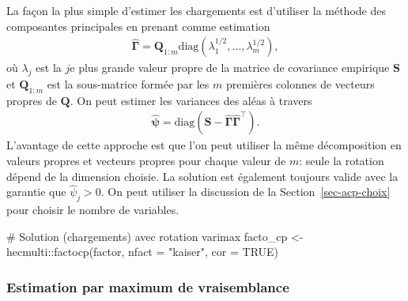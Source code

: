 \documentclass[
  11pt,
  letterpaper,
]{scrbook}
\newenvironment{Shaded}{\begin{snugshade}}{\end{snugshade}}
\newcommand{\AttributeTok}[1]{\textcolor[rgb]{0.40,0.45,0.13}{#1}}
\newcommand{\CommentTok}[1]{\textcolor[rgb]{0.37,0.37,0.37}{#1}}
\newcommand{\ConstantTok}[1]{\textcolor[rgb]{0.56,0.35,0.01}{#1}}
\newcommand{\FunctionTok}[1]{\textcolor[rgb]{0.28,0.35,0.67}{#1}}
\newcommand{\NormalTok}[1]{\textcolor[rgb]{0.00,0.23,0.31}{#1}}
\newcommand{\OtherTok}[1]{\textcolor[rgb]{0.00,0.23,0.31}{#1}}
\newcommand{\SpecialCharTok}[1]{\textcolor[rgb]{0.37,0.37,0.37}{#1}}
\newcommand{\StringTok}[1]{\textcolor[rgb]{0.13,0.47,0.30}{#1}}
\theoremstyle{definition}
\theoremstyle{remark}
\begin{document}
La façon la plus simple d'estimer les chargements est d'utiliser la
méthode des composantes principales en prenant comme estimation
\begin{align*}
\widehat{\boldsymbol{\Gamma}} = \boldsymbol{Q}_{1:m} \mathrm{diag}(\lambda_1^{1/2}, \ldots, \lambda_m^{1/2}),
\end{align*} où \(\lambda_j\) est la \(j\)e plus grande valeur propre de
la matrice de covariance empirique \(\mathbf{S}\) et
\(\boldsymbol{Q}_{1:m}\) est la sous-matrice formée par les \(m\)
premières colonnes de vecteurs propres de \(\boldsymbol{Q}\). On peut
estimer les variances des aléas à travers \begin{align*}
\widehat{\boldsymbol{\psi}} = \mathrm{diag}\left(\mathbf{S} - \widehat{\boldsymbol{\Gamma}}\widehat{\boldsymbol{\Gamma}}^\top\right).
\end{align*} L'avantage de cette approche est que l'on peut utiliser la
même décomposition en valeurs propres et vecteurs propres pour chaque
valeur de \(m\): seule la rotation dépend de la dimension choisie. La
solution est également toujours valide avec la garantie que
\(\widehat{\psi}_j>0\). On peut utiliser la discussion de la
Section~\ref{sec-acp-choix} pour choisir le nombre de variables.

\begin{Shaded}
\begin{Highlighting}[]
\CommentTok{\# Solution (chargements) avec rotation varimax}
\NormalTok{facto\_cp }\OtherTok{\textless{}{-}}\NormalTok{ hecmulti}\SpecialCharTok{::}\FunctionTok{factocp}\NormalTok{(factor, }\AttributeTok{nfact =} \StringTok{"kaiser"}\NormalTok{, }\AttributeTok{cor =} \ConstantTok{TRUE}\NormalTok{)}
\end{Highlighting}
\end{Shaded}

\subsubsection{Estimation par maximum de
vraisemblance}\label{estimation-par-maximum-de-vraisemblance}
\end{document}
